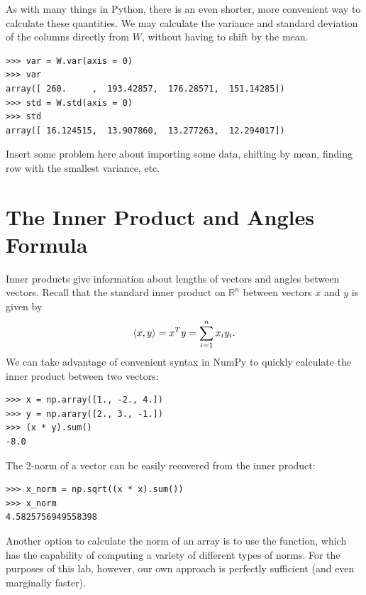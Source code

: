 As with many things in Python, there is an even shorter, more convenient way to calculate these quantities. 
We may calculate the variance and standard deviation of the columns directly from $W$, without having to shift
by the mean.

\begin{lstlisting}
>>> var = W.var(axis = 0)
>>> var
array([ 260.     ,  193.42857,  176.28571,  151.14285])
>>> std = W.std(axis = 0)
>>> std
array([ 16.124515,  13.907860,  13.277263,  12.294017])
\end{lstlisting}

\begin{problem}
\label{prob:shiftdata}
Insert some problem here about importing some data, shifting by mean, finding row with the smallest variance, etc.
\end{problem}

\section*{The Inner Product and Angles Formula}

Inner products give information about lengths of vectors and angles between vectors. 
Recall that the standard inner product on $\mathbb{R}^n$ between vectors $x$ and $y$ is given by
$$
\langle x,y \rangle = x^T y = \displaystyle\sum_{i=1}^n x_iy_i.
$$
We can take advantage of convenient syntax in NumPy to quickly calculate the inner product between two vectors:
\begin{lstlisting}
>>> x = np.array([1., -2., 4.])
>>> y = np.arary([2., 3., -1.])
>>> (x * y).sum()
-8.0
\end{lstlisting}
The 2-norm of a vector can be easily recovered from the inner product:
\begin{lstlisting}
>>> x_norm = np.sqrt((x * x).sum())
>>> x_norm
4.5825756949558398
\end{lstlisting}
Another option to calculate the norm of an array is to use the  function, which has the 
capability of computing a variety of different types of norms. For the purposes of this lab, however, our own
approach is perfectly sufficient (and even marginally faster).

